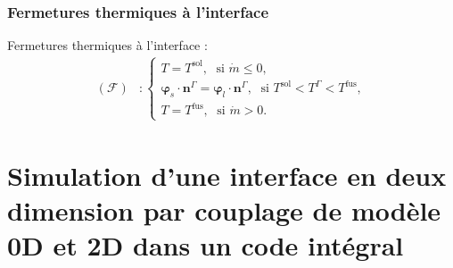 \documentclass{beamer}
\newcommand{\inte}{\Gamma}
\newcommand{\fus}{\text{fus}}
\newcommand{\sol}{\text{sol}}
\newcommand{\vect}[1]{\bm{#1}}
\newcommand{\norm}{\vect{n}}
\begin{document}
\begin{frame}
\frametitle{Fermetures thermiques à l'interface}
\footnotesize


\begin{center}
		\begin{tikzpicture}[scale = 0.5, every node/.style={scale=0.5}]
			
		\end{tikzpicture}

\end{center}
\begin{ceablock}{Fermetures thermiques à l'interface :}
\begin{align}
	(\mathcal{F}) &:\left\{ \begin{array}{l}
T=T^\sol,  \; \text{ si } \Dot{m} \leq 0, \\
\vect{\varphi}_s \cdot \norm^\inte= \vect{\varphi}_l \cdot \norm^\inte,  \; \text{ si } T^\sol < T^\inte < T^\fus,\\
T=T^\fus,   \; \text{ si } \Dot{m}>0.
 \end{array}\right.
\end{align}
\end{ceablock}
\end{frame}


\section{Simulation d'une interface en deux dimension par couplage de modèle 0D et 2D dans un code intégral}
\end{document}
